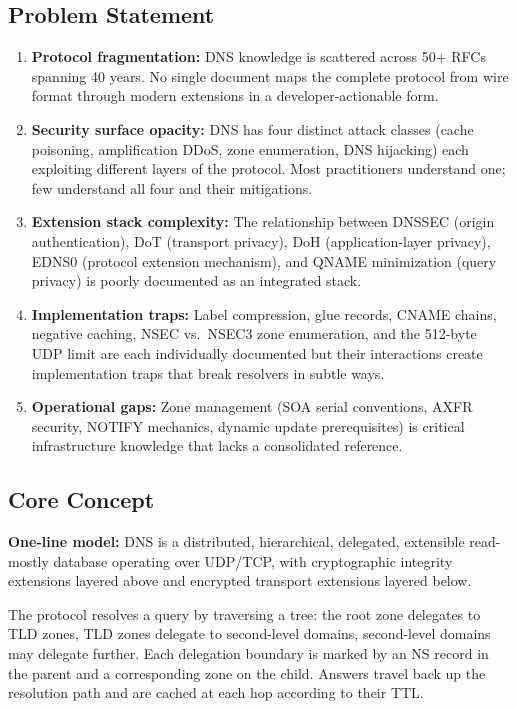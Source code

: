 \documentclass[11pt,letterpaper]{article}
\begin{document}
\subsection{Problem Statement}

\begin{enumerate}
  \item \textbf{Protocol fragmentation:} DNS knowledge is scattered across 50+ RFCs spanning 40 years. No single document maps the complete protocol from wire format through modern extensions in a developer-actionable form.
  \item \textbf{Security surface opacity:} DNS has four distinct attack classes (cache poisoning, amplification DDoS, zone enumeration, DNS hijacking) each exploiting different layers of the protocol. Most practitioners understand one; few understand all four and their mitigations.
  \item \textbf{Extension stack complexity:} The relationship between DNSSEC (origin authentication), DoT (transport privacy), DoH (application-layer privacy), EDNS0 (protocol extension mechanism), and QNAME minimization (query privacy) is poorly documented as an integrated stack.
  \item \textbf{Implementation traps:} Label compression, glue records, CNAME chains, negative caching, NSEC vs.\ NSEC3 zone enumeration, and the 512-byte UDP limit are each individually documented but their interactions create implementation traps that break resolvers in subtle ways.
  \item \textbf{Operational gaps:} Zone management (SOA serial conventions, AXFR security, NOTIFY mechanics, dynamic update prerequisites) is critical infrastructure knowledge that lacks a consolidated reference.
\end{enumerate}

\subsection{Core Concept}

\textbf{One-line model:} DNS is a distributed, hierarchical, delegated, extensible read-mostly database operating over UDP/TCP, with cryptographic integrity extensions layered above and encrypted transport extensions layered below.

The protocol resolves a query by traversing a tree: the root zone delegates to TLD zones, TLD zones delegate to second-level domains, second-level domains may delegate further. Each delegation boundary is marked by an NS record in the parent and a corresponding zone on the child. Answers travel back up the resolution path and are cached at each hop according to their TTL.
\end{document}
